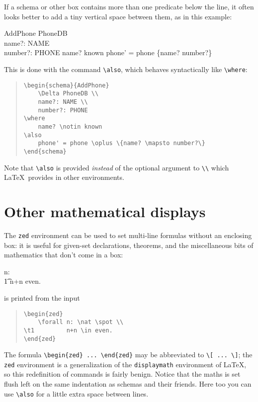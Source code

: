 If a schema or other box contains more than one predicate below the
line, it often looks better to add a tiny vertical space between
them, as in this example:
\begin{schema}{AddPhone}
    \Delta PhoneDB \\
    name?: NAME \\
    number?: PHONE
\where
    name? \notin known
\also
    phone' = phone \oplus \{name? \mapsto number?\}
\end{schema}
This is done with the command \verb|\also|, which behaves syntactically
like \verb|\where|:
\begin{quote}
\begin{verbatim}
\begin{schema}{AddPhone}
    \Delta PhoneDB \\
    name?: NAME \\
    number?: PHONE
\where
    name? \notin known
\also
    phone' = phone \oplus \{name? \mapsto number?\}
\end{schema}
\end{verbatim}
\end{quote}
Note that \verb|\also| is provided {\em instead\/} of the
optional argument to \verb|\\|
which \LaTeX\ provides in other environments.

\section{Other mathematical displays}

The \verb|zed| environment can be used to set multi-line formulas without
an enclosing box: it is useful for given-set declarations, theorems, and the
miscellaneous bits of mathematics that don't come in a box:
\begin{zed}
    \forall n: \nat \spot \\
\t1         n+n \in even.
\end{zed}
is printed from the input
\pagebreak[3]
\begin{quote}
\begin{verbatim}
\begin{zed}
    \forall n: \nat \spot \\
\t1         n+n \in even.
\end{zed}
\end{verbatim}
\end{quote}
The formula \verb|\begin{zed} ... \end{zed}| may be abbreviated to
\verb|\[ ... \]|; the \verb|zed| environment is a generalization of the
\verb|displaymath| environment of \LaTeX, so this redefinition of
commands is fairly benign. Notice that the maths is set flush left on the
same indentation as schemas and their friends.
Here too you can use \verb|\also| for a little extra space
between lines.

